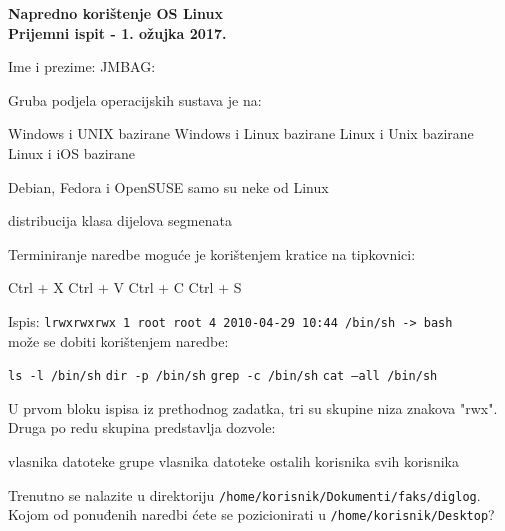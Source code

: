 \documentclass[a4paper,11pt]{exam}
\newcommand{\shell}[1]{\texttt{#1}}
\begin{document}
\firstpageheader
	{}
	{{\large \textbf{Napredno korištenje OS Linux}}\\
		\textbf{Prijemni ispit - 1. ožujka 2017.}}
	{}
\footer
	{}{}{\thepage}
	
Ime i prezime: \fillin[][7cm] \hfill JMBAG: \fillin[][5cm]\\

\begin{questions}
	\question
	Gruba podjela operacijskih sustava je na:
	
	\begin{oneparchoices}
		\CorrectChoice Windows i UNIX bazirane
		\choice Windows i Linux bazirane
		\choice Linux i Unix bazirane
		\choice Linux i iOS bazirane
	\end{oneparchoices}
	
	\question
	Debian, Fedora i OpenSUSE samo su neke od Linux
	
	\begin{oneparchoices}
		\CorrectChoice distribucija
		\choice klasa
		\choice dijelova
		\choice segmenata
	\end{oneparchoices}
	
	\question
	Terminiranje naredbe moguće je korištenjem kratice na tipkovnici:
	
	\begin{oneparchoices}
		\choice Ctrl + X
		\choice Ctrl + V
		\CorrectChoice Ctrl + C
		\choice Ctrl + S
	\end{oneparchoices}
	
	\question
    Ispis: \shell{lrwxrwxrwx 1 root root 4 2010-04-29 10:44 /bin/sh -> bash} \\može se dobiti korištenjem naredbe:
    
	\begin{oneparchoices}
		\CorrectChoice \shell{ls -l /bin/sh}
        \choice \shell{dir -p /bin/sh}
        \choice \shell{grep -c /bin/sh}
        \choice \shell{cat –all /bin/sh}
	\end{oneparchoices}

	\question
    U prvom bloku ispisa iz prethodnog zadatka, tri su skupine niza znakova "rwx". Druga po redu skupina predstavlja dozvole:
	
	\begin{oneparchoices}
        \choice vlasnika datoteke
        \CorrectChoice grupe vlasnika datoteke
        \choice ostalih korisnika
        \choice svih korisnika
	\end{oneparchoices}
	
	\question
	Trenutno se nalazite u direktoriju \shell{/home/korisnik/Dokumenti/faks/diglog}. Kojom od ponuđenih naredbi ćete se pozicionirati u \shell{/home/korisnik/Desktop}?
	

\end{questions}
\end{document}
